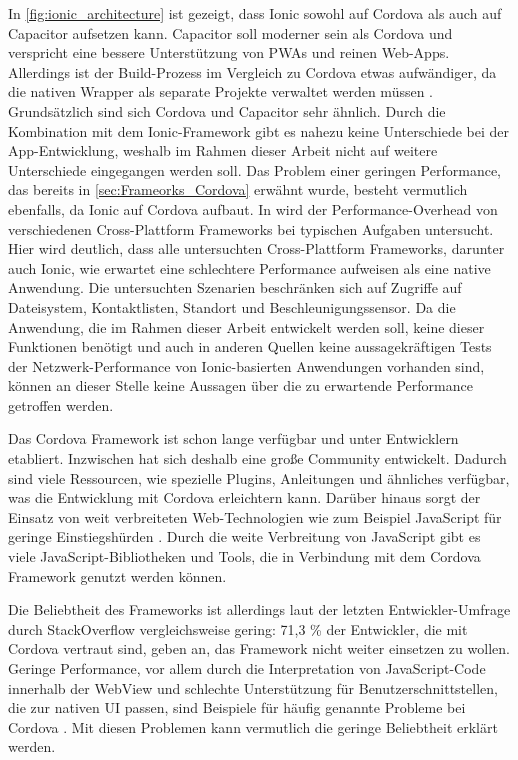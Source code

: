 In \autoref{fig:ionic_architecture} ist gezeigt, dass Ionic sowohl auf Cordova als auch auf Capacitor aufsetzen kann.
Capacitor soll moderner sein als Cordova und verspricht eine bessere Unterstützung von \acp{PWA} und reinen Web-Apps.
Allerdings ist der Build-Prozess im Vergleich zu Cordova etwas aufwändiger, da die nativen Wrapper als separate Projekte verwaltet werden müssen \cite{Ionic_Cordova_vs_Capacitor}.
Grundsätzlich sind sich Cordova und Capacitor sehr ähnlich.
Durch die Kombination mit dem Ionic-Framework gibt es nahezu keine Unterschiede bei der App-Entwicklung, weshalb im Rahmen dieser Arbeit nicht auf weitere Unterschiede eingegangen werden soll.
\newline
\newline
Das Problem einer geringen Performance, das bereits in \autoref{sec:Frameorks_Cordova} erwähnt wurde, besteht vermutlich ebenfalls, da Ionic auf Cordova aufbaut.
In \cite{Biorn-Hansen_PerformanceOverhead_CrossPlatform} wird der Performance-Overhead von verschiedenen Cross-Plattform Frameworks bei typischen Aufgaben untersucht.
Hier wird deutlich, dass alle untersuchten Cross-Plattform Frameworks, darunter auch Ionic, wie erwartet eine schlechtere Performance aufweisen als eine native Anwendung.
Die untersuchten Szenarien beschränken sich auf Zugriffe auf Dateisystem, Kontaktlisten, Standort und Beschleunigungssensor.
Da die Anwendung, die im Rahmen dieser Arbeit entwickelt werden soll, keine dieser Funktionen benötigt und auch in anderen Quellen keine aussagekräftigen Tests der Netzwerk-Performance von Ionic-basierten Anwendungen vorhanden sind, können an dieser Stelle keine Aussagen über die zu erwartende Performance getroffen werden.




Das Cordova Framework ist schon lange verfügbar und unter Entwicklern etabliert.
Inzwischen hat sich deshalb eine große Community entwickelt.
Dadurch sind viele Ressourcen, wie spezielle Plugins, Anleitungen und ähnliches verfügbar, was die Entwicklung mit Cordova erleichtern kann.
Darüber hinaus sorgt der Einsatz von weit verbreiteten Web-Technologien wie zum Beispiel JavaScript für geringe Einstiegshürden \cite{Manchanda_CrossPlatformFrameworks,Singh_Cordova_vs_Native,Sasidaran_Survey_NativeHybrid}.
Durch die weite Verbreitung von JavaScript gibt es viele JavaScript-Bibliotheken und Tools, die in Verbindung mit dem Cordova Framework genutzt werden können.

Die Beliebtheit des Frameworks ist allerdings laut der letzten Entwickler-Umfrage durch StackOverflow \cite{Stackoverflow_2022} vergleichsweise gering:
71,3 \% der Entwickler, die mit Cordova vertraut sind, geben an, das Framework nicht weiter einsetzen zu wollen.
Geringe Performance, vor allem durch die Interpretation von JavaScript-Code innerhalb der WebView und schlechte Unterstützung für Benutzerschnittstellen, die zur nativen \ac{UI} passen, sind Beispiele für häufig genannte Probleme bei Cordova \cite{Rieger_CrossPlatform_EvaluationFramework,Manchanda_CrossPlatformFrameworks,Heitkoetter_CrossPlatform_Comparison,Biorn-Hansen_PerformanceOverhead_CrossPlatform}.
Mit diesen Problemen kann vermutlich die geringe Beliebtheit erklärt werden.
